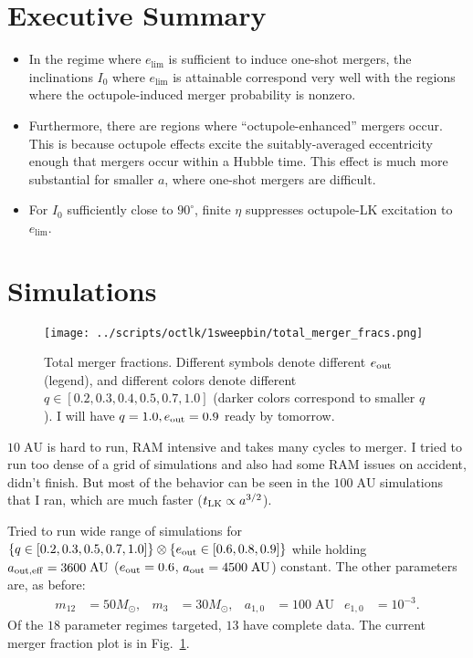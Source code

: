 \documentclass[11pt,
        usenames, %
        dvipsnames %
    ]{article}
\newcommand*{\z}[1]{\left\{#1\right\}}
\begin{document}
\section{Executive Summary}

\begin{itemize}
    \item In the regime where $e_{\lim}$ is sufficient to induce one-shot
        mergers, the inclinations $I_0$ where $e_{\lim}$ is attainable
        correspond very well with the regions where the octupole-induced merger
        probability is nonzero.

    \item Furthermore, there are regions where ``octupole-enhanced'' mergers
        occur. This is because octupole effects excite the suitably-averaged
        eccentricity enough that mergers occur within a Hubble time. This effect
        is much more substantial for smaller $a$, where one-shot mergers are
        difficult.

    \item For $I_0$ sufficiently close to $90^\circ$, finite $\eta$ suppresses
        octupole-LK excitation to $e_{\lim}$.
\end{itemize}

\section{Simulations}

\begin{figure}[h]
    \centering
    \texttt{[image: ../scripts/octlk/1sweepbin/total\_merger\_fracs.png]}
    \caption{Total merger fractions. Different symbols denote different $e_{\rm
    out}$ (legend), and different colors denote different $q \in [0.2, 0.3, 0.4,
    0.5, 0.7, 1.0]$ (darker colors correspond to smaller $q$). I will have $q =
    1.0, e_{\rm out} = 0.9$ ready by tomorrow. }\label{fig:merger_fracs}
\end{figure}

$10\;\mathrm{AU}$ is hard to run, RAM intensive and takes many cycles to merger.
I tried to run too dense of a grid of simulations and also had some RAM issues
on accident, didn't finish. But most of the behavior can be seen in the
$100\;\mathrm{AU}$ simulations that I ran, which are much faster ($t_{\rm LK}
\propto a^{3/2}$).

Tried to run wide range of simulations for $\z{q \in [0.2, 0.3, 0.5, 0.7, 1.0]}
\otimes \z{e_{\rm out} \in [0.6, 0.8, 0.9]}$ while holding $a_{\rm out, eff} =
3600\;\mathrm{AU}$ ($e_{\rm out} = 0.6$, $a_{\rm out} = 4500\;\mathrm{AU}$)
constant. The other parameters are, as before:
\begin{align*}
    m_{12} &= 50M_{\odot}, &
    m_3 &= 30 M_{\odot}, &
    a_{1,0} &= 100\;\mathrm{AU}&
    e_{1, 0} &= 10^{-3}.
\end{align*}
Of the $18$ parameter regimes targeted, $13$ have complete data. The current
merger fraction plot is in Fig.~\ref{fig:merger_fracs}.
\end{document}
